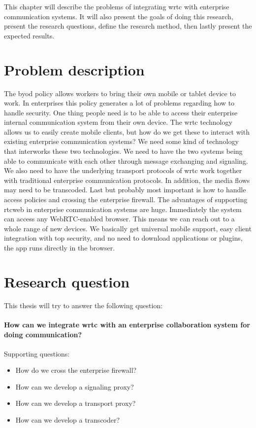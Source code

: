 
This chapter will describe the problems of integrating \gls{wrtc} with enterprise communication systems. It will also present the goals of doing this research, present the research questions, define the research method, then lastly present the expected results.

\section{Problem description}
The \gls{byod} policy allows workers to bring their own mobile or tablet device to work. In enterprises this policy generates a lot of problems regarding how to handle security. One thing people need is to be able to access their enterprise internal communication system from their own device. The \gls{wrtc} technology allows us to easily create mobile clients, but how do we get these to interact with existing enterprise communication systems? We need some kind of technology that interworks these two technologies. We need to have the two systems being able to communicate with each other through message exchanging and signaling. We also need to have the underlying transport protocols of \gls{wrtc} work together with traditional enterprise communication protocols. In addition, the media flows may need to be transcoded. Last but probably most important is how to handle access policies and crossing the enterprise firewall. The advantages of supporting \gls{rtcweb} in enterprise communication systems are huge. Immediately the system can access any WebRTC-enabled browser. This means we can reach out to a whole range of new devices. We basically get universal mobile support, easy client integration with top security, and no need to download applications or plugins, the app runs directly in the browser.

\section{Research question}
This thesis will try to answer the following question:
\\
\\
\textbf{How can we integrate \gls{wrtc} with an enterprise collaboration system for doing communication?}
\\
\\
Supporting questions:

\begin{itemize}
\item How do we cross the enterprise firewall?
\item How can we develop a signaling proxy?
\item How can we develop a transport proxy?
\item How can we develop a transcoder?
\end{itemize}

